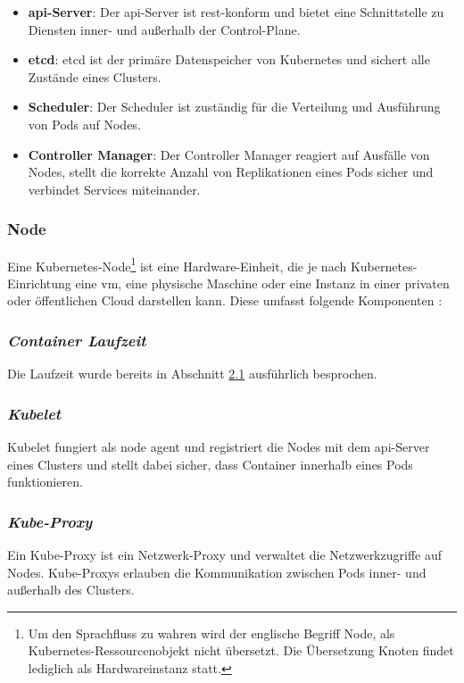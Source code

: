 \begin{itemize}
  \item \textbf{\acs{api}-Server}: Der \acs{api}-Server ist \acs{rest}-konform und bietet eine Schnittstelle zu Diensten
  inner- und außerhalb der Control-Plane.
  \item \textbf{etcd}: etcd ist der primäre Datenspeicher von Kubernetes und sichert alle Zustände eines Clusters.
  \item \textbf{Scheduler}: Der Scheduler ist zuständig für die Verteilung und Ausführung von Pods auf Nodes.
  \item \textbf{Controller Manager}: Der Controller Manager reagiert auf Ausfälle von Nodes, stellt die korrekte Anzahl von Replikationen eines Pods sicher und verbindet Services miteinander.
\end{itemize}

\subsubsection{Node}
Eine Kubernetes-Node\footnote{Um den Sprachfluss zu wahren wird der englische Begriff Node, als Kubernetes-Ressourcenobjekt nicht übersetzt. 
Die Übersetzung Knoten findet lediglich als Hardwareinstanz statt.} 
ist eine Hardware-Einheit, die je nach Kubernetes-Einrichtung eine \acs{vm}, eine physische Maschine oder 
eine Instanz in einer privaten oder öffentlichen Cloud darstellen kann.
Diese umfasst folgende Komponenten \cite{kubernetesnodes}:

\subsubsection{\textit{Container Laufzeit}}
Die Laufzeit wurde bereits in Abschnitt \hyperref[Docker]{2.1} ausführlich besprochen.

\subsubsection{\textit{Kubelet}}
Kubelet fungiert als \glqq node agent\grqq{} und registriert die Nodes mit dem
\acs{api}-Server eines Clusters und stellt dabei sicher, dass Container innerhalb eines Pods
funktionieren.

\subsubsection{\textit{Kube-Proxy}}
Ein Kube-Proxy ist ein Netzwerk-Proxy und verwaltet die Netzwerkzugriffe auf Nodes.
Kube-Proxys erlauben die Kommunikation zwischen Pods inner- und außerhalb des Clusters.

